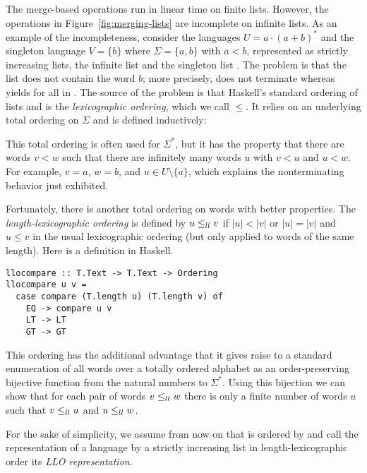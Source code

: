 The merge-based operations run in linear time on finite
lists. However, the operations in Figure~\ref{fig:merging-lists} are
incomplete on infinite lists. As 
an example of the incompleteness, consider the languages $U = a\cdot
(a+b)^*$ and the singleton language $V = \{b\}$ where $\Sigma = \{a, b\}$
with $a<b$, represented as strictly increasing lists, the infinite
list  and the singleton list . The problem is that
the list  does not contain the word $b$; more
precisely,  does not
terminate whereas  yields  for
all  in . The source 
of the problem is that Haskell's standard ordering of lists and
 is the \emph{lexicographic ordering}, which we call
$\le$. It relies on an underlying total ordering on $\Sigma$ and is
defined inductively:
\begin{mathpar}
  

\end{mathpar}

This total ordering
is often used for $\Sigma^*$, but it has the property that
there are words $v<w$ such that there are infinitely many words $u$
with $v<u$ and $u<w$. For example, $v=a$, $w=b$, and $u\in U \setminus
\{a\}$, which explains the nonterminating behavior just exhibited.

Fortunately, there is another total ordering on words with better
properties. The
\emph{length-lexicographic ordering} is defined by $u \lleq 
v$ if $|u|<|v|$ or $|u|=|v|$ and $u\le v$ in the usual lexicographic
ordering (but only applied to words of the same length). Here is a definition in Haskell.
\begin{lstlisting}
llocompare :: T.Text -> T.Text -> Ordering
llocompare u v =
  case compare (T.length u) (T.length v) of
    EQ -> compare u v
    LT -> LT
    GT -> GT
\end{lstlisting}
This ordering has the additional advantage that it gives raise to a standard
enumeration of all words over a totally ordered alphabet as an order-preserving
bijective function from the natural numbers to $\Sigma^*$. Using this
bijection we can show that for each pair of words $v \lleq w$ there is only a finite
number of words $u$ such that $v \lleq u$ and $u \lleq w$. 

For the sake of simplicity, we assume from now on that 
is ordered by  and call the representation of a
language by a strictly increasing list in length-lexicographic order
its \emph{LLO representation}. 

